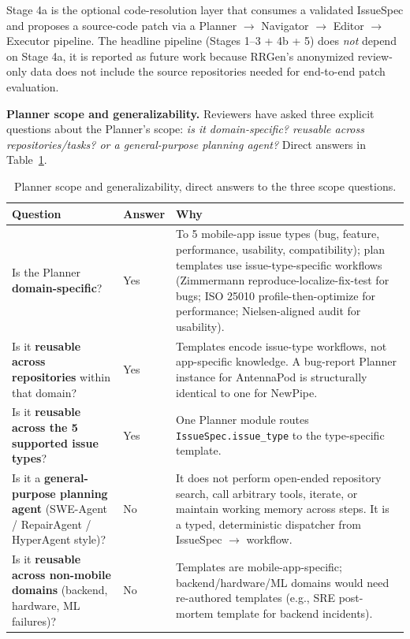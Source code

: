\documentclass[sigconf, nonacm, anonymous, balance=false]{acmart}
\begin{document}
Stage 4a is the optional code-resolution layer that consumes a validated IssueSpec and proposes a source-code patch via a Planner $\rightarrow$ Navigator $\rightarrow$ Editor $\rightarrow$ Executor pipeline. The headline pipeline (Stages 1--3 + 4b + 5) does \emph{not} depend on Stage 4a, it is reported as future work because RRGen's anonymized review-only data does not include the source repositories needed for end-to-end patch evaluation.

\textbf{Planner scope and generalizability.} Reviewers have asked three explicit questions about the Planner's scope: \emph{is it domain-specific? reusable across repositories/tasks? or a general-purpose planning agent?} Direct answers in Table~\ref{tab:planner-scope}.

\begin{table}[t]\centering\footnotesize\setlength{\tabcolsep}{3pt}
\caption{Planner scope and generalizability, direct answers to the three scope questions.}\label{tab:planner-scope}
\begin{tabular}{p{3.6cm}p{1cm}p{3.2cm}}\toprule
Question & Answer & Why \\\midrule
Is the Planner \textbf{domain-specific}? & Yes & To 5 mobile-app issue types (bug, feature, performance, usability, compatibility); plan templates use issue-type-specific workflows (Zimmermann reproduce-localize-fix-test for bugs; ISO 25010 profile-then-optimize for performance; Nielsen-aligned audit for usability). \\
\addlinespace
Is it \textbf{reusable across repositories} within that domain? & Yes & Templates encode issue-type workflows, not app-specific knowledge. A bug-report Planner instance for AntennaPod is structurally identical to one for NewPipe. \\
\addlinespace
Is it \textbf{reusable across the 5 supported issue types}? & Yes & One Planner module routes \texttt{IssueSpec.issue\_type} to the type-specific template. \\
\addlinespace
Is it a \textbf{general-purpose planning agent} (SWE-Agent / RepairAgent / HyperAgent style)? & No & It does not perform open-ended repository search, call arbitrary tools, iterate, or maintain working memory across steps. It is a typed, deterministic dispatcher from IssueSpec $\rightarrow$ workflow. \\
\addlinespace
Is it \textbf{reusable across non-mobile domains} (backend, hardware, ML failures)? & No & Templates are mobile-app-specific; backend/hardware/ML domains would need re-authored templates (e.g., SRE post-mortem template for backend incidents). \\
\bottomrule\end{tabular}\end{table}
\end{document}
